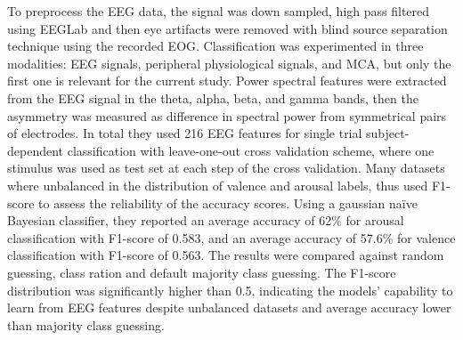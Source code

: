 To preprocess the \ac{EEG} data, the signal was down sampled, high pass filtered using EEGLab and then eye artifacts were removed with blind source separation technique using the recorded \ac{EOG}. Classification was experimented in three modalities: \ac{EEG} signals, peripheral physiological signals, and \ac{MCA}, but only the first one is relevant for the current study. Power spectral features were extracted from the \ac{EEG} signal in the theta, alpha, beta, and gamma bands, then the asymmetry was measured as difference in spectral power from symmetrical pairs of electrodes. In total they used 216 \ac{EEG} features for single trial subject-dependent classification with leave-one-out cross validation scheme, where one stimulus was used as test set at each step of the cross validation. Many datasets where unbalanced in the distribution of valence and arousal labels, thus used F1-score to assess the reliability of the accuracy scores. Using a gaussian naïve Bayesian classifier, they reported an average accuracy of 62\% for arousal classification with F1-score of 0.583, and an average accuracy of 57.6\% for valence classification with F1-score of 0.563. The results were compared against random guessing, class ration and default majority class guessing. The F1-score distribution was significantly higher than 0.5, indicating the models’ capability to learn from \ac{EEG} features despite unbalanced datasets and average accuracy lower than majority class guessing.
\\
\\
